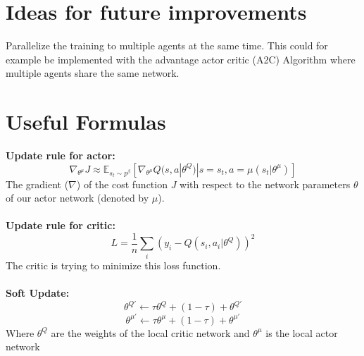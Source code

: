 \documentclass[12pt,a4paper]{article}
\begin{document}
    \section{Ideas for future improvements}\label{sec:ideas}
    Parallelize the training to multiple agents at the same time.
    This could for example be implemented with the advantage actor critic (A2C) Algorithm where multiple agents share the same network.

    \pagebreak


    \section{Useful Formulas}\label{sec:formulars}
    \textbf{Update rule for actor:}
    $$\nabla_{\theta^{\mu}}J\approx \mathbb{E}_{s_{t}\sim p^{\beta}}[\nabla_{\theta^{\mu}}Q(s,a|\theta^{Q})|s=s_{t}, a=\mu(s_{t}|\theta^{\mu})]$$
    The gradient ($\nabla$) of the cost function $J$ with respect to the network parameters $\theta$ of our actor network (denoted by $\mu$).
    \\\\
    \textbf{Update rule for critic:}
    $$L=\frac{1}{n}\sum_{i}{(y_{i}-Q(s_{i}, a_{i}|\theta^{Q}))^{2}}$$
    The critic is trying to minimize this loss function.
    \\\\
    \textbf{Soft Update:}
    $$\theta^{Q'}\leftarrow \tau\theta^{Q}+(1-\tau)+\theta^{Q'}$$
    $$\theta^{\mu'}\leftarrow \tau\theta^{\mu}+(1-\tau)+\theta^{\mu'}$$
    Where $\theta^{Q}$ are the weights of the local critic network and $\theta^{\mu}$ is the local actor network
\end{document}
